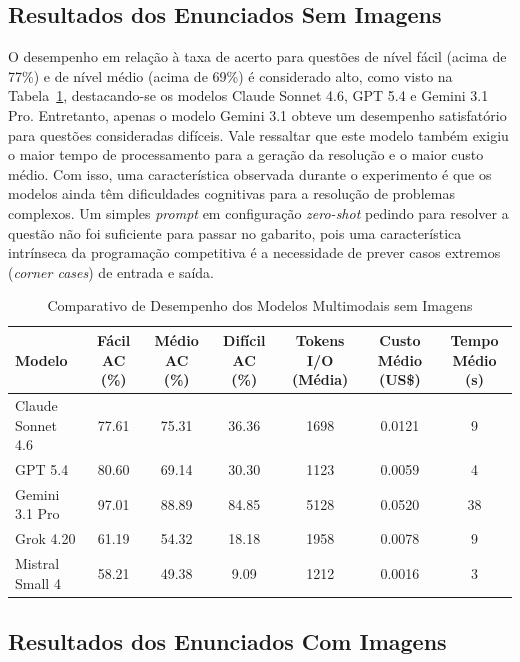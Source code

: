 \documentclass[sigconf,anonymous]{acmart} %
\begin{document}
\subsection{Resultados dos Enunciados Sem Imagens}
\label{subsec:resultados_sem_imagens}

O desempenho em relação à taxa de acerto para questões de nível fácil (acima de 77\%) e de nível médio (acima de 69\%) é considerado alto, como visto na Tabela~\ref{tab:desempenho_modelos_sem_imagens}, destacando-se os modelos Claude Sonnet 4.6, GPT 5.4 e Gemini 3.1 Pro. Entretanto, apenas o modelo Gemini 3.1 obteve um desempenho satisfatório para questões consideradas difíceis. Vale ressaltar que este modelo também exigiu o maior tempo de processamento para a geração da resolução e o maior custo médio. Com isso, uma característica observada durante o experimento é que os modelos ainda têm dificuldades cognitivas para a resolução de problemas complexos. Um simples \textit{prompt} em configuração \textit{zero-shot} pedindo para resolver a questão não foi suficiente para passar no gabarito, pois uma característica intrínseca da programação competitiva é a necessidade de prever casos extremos (\textit{corner cases}) de entrada e saída.

\begin{table}[htbp]
  \caption{Comparativo de Desempenho dos Modelos Multimodais sem Imagens}
  \label{tab:desempenho_modelos_sem_imagens}
  \begin{tabular}{l c c c c c c}
    \toprule
    \textbf{Modelo} & \textbf{Fácil AC (\%)} & \textbf{Médio AC (\%)} & \textbf{Difícil AC (\%)} & \textbf{Tokens I/O (Média)} & \textbf{Custo Médio (US\$)} & \textbf{Tempo Médio (s)} \\
    \midrule
    Claude Sonnet 4.6 & 77.61 & 75.31 & 36.36 & 1698 & 0.0121 & 9 \\
    GPT 5.4           & 80.60 & 69.14 & 30.30 & 1123 & 0.0059 & 4 \\
    Gemini 3.1 Pro    & 97.01 & 88.89 & 84.85 & 5128 & 0.0520 & 38 \\
    Grok 4.20         & 61.19 & 54.32 & 18.18 & 1958 & 0.0078 & 9 \\
    Mistral Small 4   & 58.21 & 49.38 & 9.09  & 1212 & 0.0016 & 3 \\
    \bottomrule
  \end{tabular}
\end{table}

\subsection{Resultados dos Enunciados Com Imagens}
\label{subsec:resultados_com_imagens}
\end{document}
